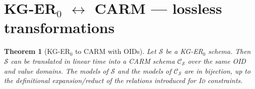 \documentclass[10pt]{article}
\newtheorem{definition}{Definition}
\newtheorem{theorem}{Theorem}
\begin{document}
%
%



\section{KG-ER$_0$ $\leftrightarrow$ \textsf{CARM} --- lossless transformations}

\begin{theorem}[KG-ER$_0$ to \textsf{CARM} with OIDs]
\label{thm:kgerzero-to-carm-oids}
Let $\mathcal S$ be a KG-ER$_0$ schema.  Then
$\mathcal S$ can be translated in linear time into a \textsf{CARM}
schema $\mathcal C_{\mathcal S}$ over the same OID and value domains.
The models of $\mathcal S$ and the models of $\mathcal C_{\mathcal S}$
are in bijection, up to the definitional expansion/reduct of the
relations introduced for \textsc{Id} constraints.
\end{theorem}
\end{document}
